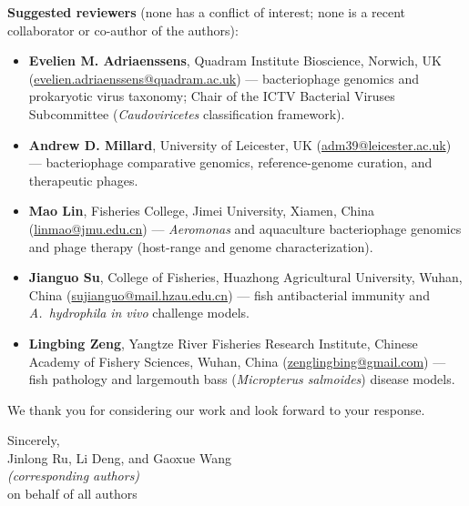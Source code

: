 \documentclass[11pt,a4paper]{article}
\begin{document}
\medskip
\noindent\textbf{Suggested reviewers} (none has a conflict of interest; none is a
recent collaborator or co-author of the authors):
\begin{itemize}
\item \textbf{Evelien M. Adriaenssens}, Quadram Institute Bioscience, Norwich, UK
(\href{mailto:evelien.adriaenssens@quadram.ac.uk}{evelien.adriaenssens@quadram.ac.uk})
--- bacteriophage genomics and prokaryotic virus taxonomy; Chair of the ICTV
Bacterial Viruses Subcommittee (\emph{Caudoviricetes} classification framework).
\item \textbf{Andrew D. Millard}, University of Leicester, UK
(\href{mailto:adm39@leicester.ac.uk}{adm39@leicester.ac.uk}) --- bacteriophage
comparative genomics, reference-genome curation, and therapeutic phages.
\item \textbf{Mao Lin}, Fisheries College, Jimei University, Xiamen, China
(\href{mailto:linmao@jmu.edu.cn}{linmao@jmu.edu.cn}) --- \emph{Aeromonas} and
aquaculture bacteriophage genomics and phage therapy (host-range and genome
characterization).
\item \textbf{Jianguo Su}, College of Fisheries, Huazhong Agricultural University,
Wuhan, China (\href{mailto:sujianguo@mail.hzau.edu.cn}{sujianguo@mail.hzau.edu.cn})
--- fish antibacterial immunity and \emph{A.~hydrophila} \emph{in vivo} challenge
models.
\item \textbf{Lingbing Zeng}, Yangtze River Fisheries Research Institute, Chinese
Academy of Fishery Sciences, Wuhan, China
(\href{mailto:zenglingbing@gmail.com}{zenglingbing@gmail.com}) --- fish pathology
and largemouth bass (\emph{Micropterus salmoides}) disease models.
\end{itemize}

\medskip
\noindent We thank you for considering our work and look forward to your
response.

\bigskip
\noindent Sincerely,\\[1ex]
Jinlong Ru, Li Deng, and Gaoxue Wang\\
\emph{(corresponding authors)}\\
on behalf of all authors
\end{document}
